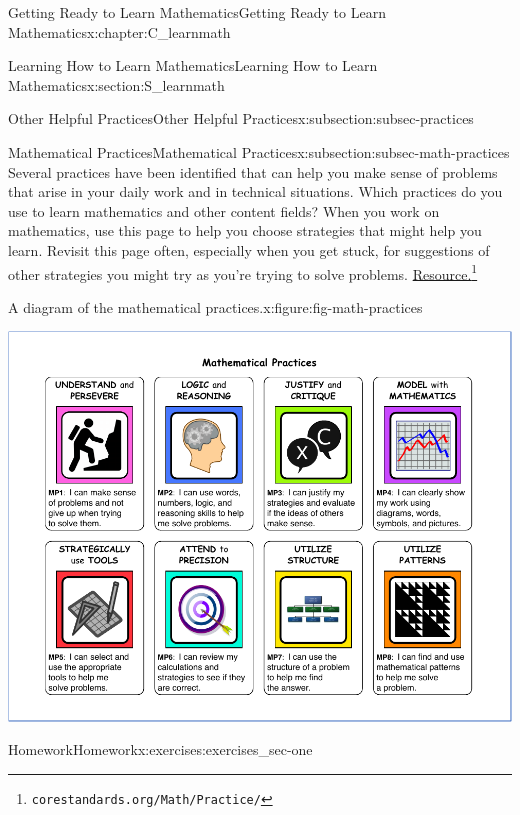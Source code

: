 \documentclass[oneside,10pt,]{book}
\numberwithin{equation}{chapter}
\begin{document}
\begin{chapterptx}{Getting Ready to Learn Mathematics}{}{Getting Ready to Learn Mathematics}{}{}{x:chapter:C_learnmath}
\begin{sectionptx}{Learning How to Learn Mathematics}{}{Learning How to Learn Mathematics}{}{}{x:section:S_learnmath}
\begin{subsectionptx}{Other Helpful Practices}{}{Other Helpful Practices}{}{}{x:subsection:subsec-practices}
\end{subsectionptx}
%
%
\typeout{************************************************}
\typeout{************************************************}
%
\begin{subsectionptx}{Mathematical Practices}{}{Mathematical Practices}{}{}{x:subsection:subsec-math-practices}
Several practices have been identified that can help you make sense of problems that arise in your daily work and in technical situations. Which practices do you use to learn mathematics and other content fields? When you work on mathematics, use this page to help you choose strategies that might help you learn. Revisit this page often, especially when you get stuck, for suggestions of other strategies you might try as you're trying to solve problems. \href{http://www.corestandards.org/Math/Practice/}{Resource.}\footnote{\nolinkurl{corestandards.org/Math/Practice/}\label{g:fn:idp1706732440}}%
\begin{figureptx}{A diagram of the mathematical practices.}{x:figure:fig-math-practices}{}%
\begin{image}{0}{1}{0}%
\includegraphics[width=\linewidth]{external/math-practices.pdf}
\end{image}%
\tcblower
\end{figureptx}%
\end{subsectionptx}
%
%
\typeout{************************************************}
\typeout{************************************************}
%
\begin{exercises-subsection}{Homework}{}{Homework}{}{}{x:exercises:exercises_sec-one}

\end{exercises-subsection}
\end{sectionptx}
\end{chapterptx}
\end{document}
